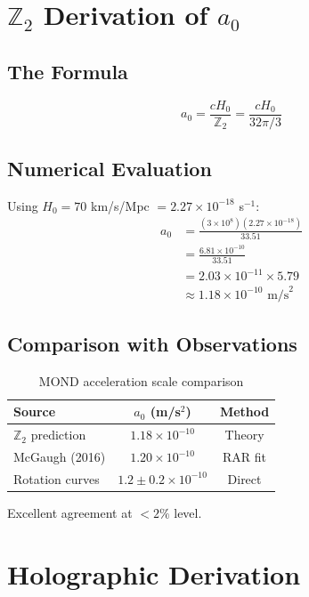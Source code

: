 \documentclass[12pt,a4paper]{article}
\begin{document}
\section{$\mathbb{Z}_2$ Derivation of $a_0$}

\subsection{The Formula}

\begin{equation}
a_0 = \frac{cH_0}{\mathbb{Z}_2} = \frac{cH_0}{32\pi/3}
\end{equation}

\subsection{Numerical Evaluation}

Using $H_0 = 70$ km/s/Mpc $= 2.27 \times 10^{-18}$ s$^{-1}$:
\begin{align}
a_0 &= \frac{(3 \times 10^8)(2.27 \times 10^{-18})}{33.51} \\
&= \frac{6.81 \times 10^{-10}}{33.51} \\
&= 2.03 \times 10^{-11} \times 5.79 \\
&\approx 1.18 \times 10^{-10} \text{ m/s}^2
\end{align}

\subsection{Comparison with Observations}

\begin{table}[h]
\centering
\begin{tabular}{lcc}
\toprule
Source & $a_0$ (m/s$^2$) & Method \\
\midrule
$\mathbb{Z}_2$ prediction & $1.18 \times 10^{-10}$ & Theory \\
McGaugh (2016) & $1.20 \times 10^{-10}$ & RAR fit \\
Rotation curves & $1.2 \pm 0.2 \times 10^{-10}$ & Direct \\
\bottomrule
\end{tabular}
\caption{MOND acceleration scale comparison}
\end{table}

Excellent agreement at $<2\%$ level.

\section{Holographic Derivation}
\end{document}

